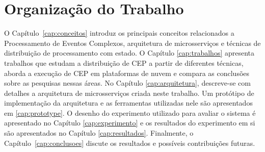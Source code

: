 


\section{Organização do Trabalho}
\label{sec:organizacao_trabalho}


O Capítulo~\ref{cap:conceitos} introduz os principais conceitos relacionados a Processamento de Eventos Complexos, arquitetura de microsserviços e técnicas de distribuição de processamento com estado. O Capítulo \ref{cap:trabalhos} apresenta trabalhos que estudam a distribuição de CEP a partir de diferentes técnicas, aborda a execução de CEP em plataformas de nuvem e compara as conclusões sobre as pesquisas nessas áreas. No Capítulo \ref{cap:arquitetura}, descreve-se com detalhes a arquitetura de microsserviços criada neste trabalho. Um protótipo de implementação da arquitetura e as ferramentas utilizadas nele  são apresentados em \ref{cap:prototype}. O desenho do experimento utilizado para avaliar o sistema é apresentado no Capítulo \ref{cap:experimento} e os resultados do experimento em si são apresentados no Capítulo \ref{cap:resultados}. Finalmente, o Capítulo~\ref{cap:conclusoes} discute os resultados e  possíveis contribuições futuras.

